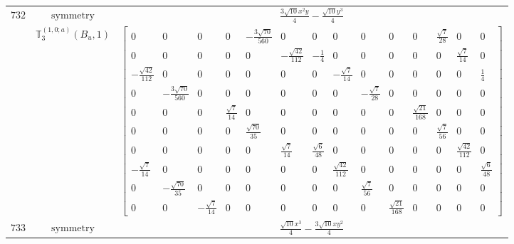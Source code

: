\documentclass[fleqn,8pt,landscape]{jsarticle}
\begin{document}
\begin{longtable}{ccc}
$ 732 $ & $ \text{symmetry} $ & $ \frac{3 \sqrt{10} x^{2} y}{4} - \frac{\sqrt{10} y^{3}}{4} $ \\
$  $ & $ \mathbb{T}_{3}^{(1,0;a)}(B_{u},1) $ & $ \begin{bmatrix} 0 & 0 & 0 & 0 & - \frac{3 \sqrt{70}}{560} & 0 & 0 & 0 & 0 & 0 & 0 & \frac{\sqrt{7}}{28} & 0 & 0 \\ 0 & 0 & 0 & 0 & 0 & - \frac{\sqrt{42}}{112} & - \frac{1}{4} & 0 & 0 & 0 & 0 & 0 & \frac{\sqrt{7}}{14} & 0 \\ - \frac{\sqrt{42}}{112} & 0 & 0 & 0 & 0 & 0 & 0 & - \frac{\sqrt{7}}{14} & 0 & 0 & 0 & 0 & 0 & \frac{1}{4} \\ 0 & - \frac{3 \sqrt{70}}{560} & 0 & 0 & 0 & 0 & 0 & 0 & - \frac{\sqrt{7}}{28} & 0 & 0 & 0 & 0 & 0 \\ 0 & 0 & 0 & \frac{\sqrt{7}}{14} & 0 & 0 & 0 & 0 & 0 & 0 & \frac{\sqrt{21}}{168} & 0 & 0 & 0 \\ 0 & 0 & 0 & 0 & \frac{\sqrt{70}}{35} & 0 & 0 & 0 & 0 & 0 & 0 & \frac{\sqrt{7}}{56} & 0 & 0 \\ 0 & 0 & 0 & 0 & 0 & \frac{\sqrt{7}}{14} & \frac{\sqrt{6}}{48} & 0 & 0 & 0 & 0 & 0 & \frac{\sqrt{42}}{112} & 0 \\ - \frac{\sqrt{7}}{14} & 0 & 0 & 0 & 0 & 0 & 0 & \frac{\sqrt{42}}{112} & 0 & 0 & 0 & 0 & 0 & \frac{\sqrt{6}}{48} \\ 0 & - \frac{\sqrt{70}}{35} & 0 & 0 & 0 & 0 & 0 & 0 & \frac{\sqrt{7}}{56} & 0 & 0 & 0 & 0 & 0 \\ 0 & 0 & - \frac{\sqrt{7}}{14} & 0 & 0 & 0 & 0 & 0 & 0 & \frac{\sqrt{21}}{168} & 0 & 0 & 0 & 0 \end{bmatrix} $ \\ \hline
$ 733 $ & $ \text{symmetry} $ & $ \frac{\sqrt{10} x^{3}}{4} - \frac{3 \sqrt{10} x y^{2}}{4} $ \\

\end{longtable}
\end{document}
